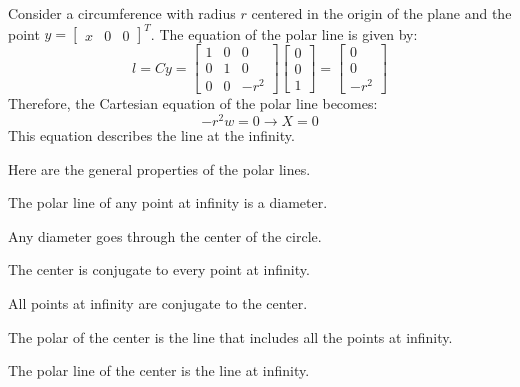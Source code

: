 \documentclass[12pt, a4paper]{report}
\begin{document}
    \begin{example}
        Consider a circumference with radius $r$ centered in the origin of the plane and the point $y={\begin{bmatrix} x & 0 & 0 \end{bmatrix}}^T$.
        The equation of the polar line is given by:
        \[
        l=Cy=
        \begin{bmatrix}
            1 & 0 & 0 \\
            0 & 1 & 0 \\
            0 & 0 & -r^2
        \end{bmatrix}    
        \begin{bmatrix}
            0 \\
            0 \\
            1 
        \end{bmatrix}    
        = 
        \begin{bmatrix}
            0 \\
            0 \\
            -r^2 
        \end{bmatrix}  
        \]
        Therefore, the Cartesian equation of the polar line becomes: 
        \[-r^2w=0 \rightarrow X=0\]
        This equation describes the line at the infinity. 
    \end{example}
    Here are the general properties of the polar lines.
    \begin{property}
        The polar line of any point at infinity is a diameter.
    \end{property}
    \begin{property}
        Any diameter goes through the center of the circle.
    \end{property}
    \begin{property}
        The center is conjugate to every point at infinity.
    \end{property}
    \begin{property}
        All points at infinity are conjugate to the center.
    \end{property}
    \begin{property}
        The polar of the center is the line that includes all the points at infinity.
    \end{property}
    \begin{property}
        The polar line of the center is the line at infinity.
    \end{property}
\end{document}
